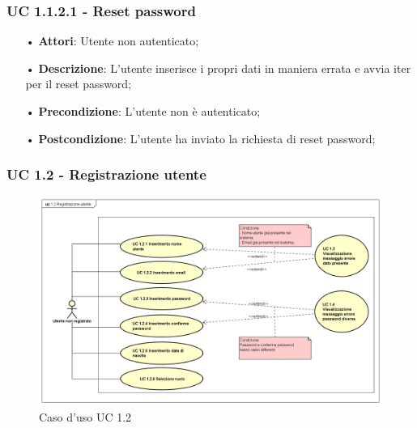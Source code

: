 \subsubsection{UC 1.1.2.1 - Reset password}
\begin{itemize}
	\item[•]\textbf{Attori}: Utente non autenticato;
	\item[•]\textbf{Descrizione}: L’utente inserisce i propri dati in maniera errata e avvia iter per il reset password;
	\item[•]\textbf{Precondizione}: L’utente non è autenticato;
	\item[•]\textbf{Postcondizione}: L’utente ha inviato la richiesta di reset password;
\end{itemize}

\subsubsection{UC 1.2 - Registrazione utente}
\begin{figure}[H]
	\centering
	\includegraphics[width=17cm]{img/UC12.png} 
	\caption{Caso d'uso UC 1.2}\label{fig:12}
\end{figure}
